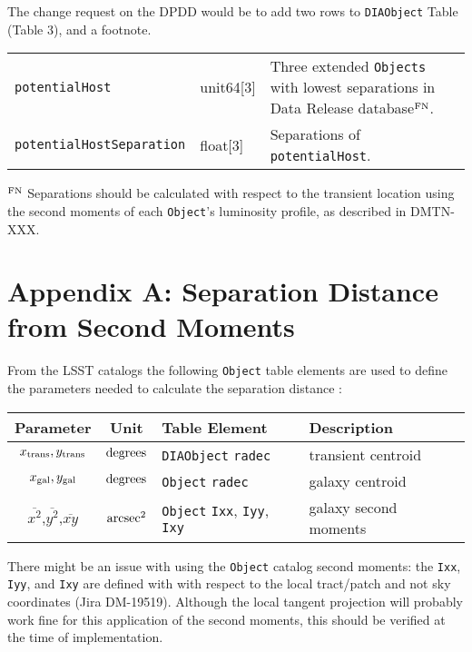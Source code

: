 \documentclass[DM,lsstdraft,authoryear,toc]{lsstdoc}
\begin{document}
The change request on the DPDD would be to add two rows to {\tt DIAObject} Table (Table 3), and a footnote.

\begin{tabular}{p{4.5cm} p{2cm} p{8cm}}
{\tt potentialHost} & unit64[3] & Three extended {\tt Objects} with lowest separations in Data Release database$^{\rm FN}$. \\
{\tt potentialHostSeparation} & float[3] & Separations of {\tt potentialHost}.   \\
\end{tabular}

$^{\rm FN}$ Separations should be calculated with respect to the transient location using the second moments of each {\tt Object}'s luminosity profile, as described in DMTN-XXX.



\clearpage
\section{Appendix A: Separation Distance from Second Moments}\label{sec:appA}

From the LSST catalogs the following {\tt Object} table elements are used to define the parameters needed to calculate the separation distance :

\begin{center}
\begin{tabular}{ccll}
\hline
Parameter & Unit & Table Element & Description \\
\hline
$x_{\rm trans},y_{\rm trans}$ & $\rm degrees$ & {\tt DIAObject} {\tt radec} & transient centroid  \\
$x_{\rm gal},y_{\rm gal}$       & $\rm degrees$ & {\tt Object} {\tt radec}       & galaxy centroid      \\
$\overline{x^2}$,$\overline{y^2}$,$\overline{xy}$ & $\rm arcsec^2$  & {\tt Object} {\tt Ixx}, {\tt Iyy}, {\tt Ixy} & galaxy second moments \\
\hline
\end{tabular}
\end{center}

There might be an issue with using the {\tt Object} catalog second moments: the {\tt Ixx}, {\tt Iyy}, and {\tt Ixy} are defined with with respect to the local tract/patch and not sky coordinates (Jira DM-19519).
Although the local tangent projection will probably work fine for this application of the second moments, this should be verified at the time of implementation.
\end{document}
